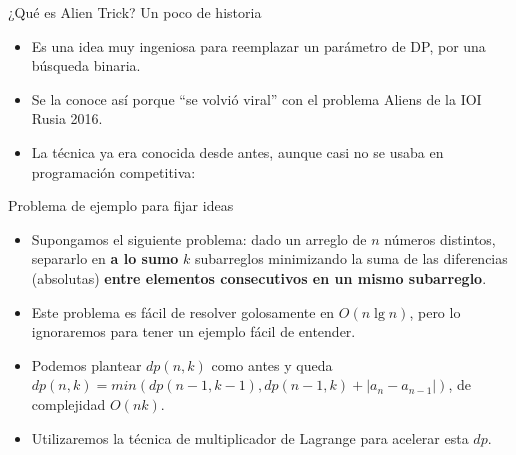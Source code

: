 \documentclass{beamer}
\begin{document}
\begin{frame}{¿Qué es Alien Trick? Un poco de historia}
    \begin{itemize}
		\item Es una idea muy ingeniosa para reemplazar un parámetro de DP, por una búsqueda binaria.
        \item Se la conoce así porque ``se volvió viral'' con el problema Aliens de la IOI Rusia 2016.
        \item La técnica ya era conocida desde antes, aunque casi no se usaba en programación competitiva:
        \pause
    \end{itemize}
\end{frame}

\begin{frame}{Problema de ejemplo para fijar ideas}
    \begin{itemize}
		\item Supongamos el siguiente problema: dado un arreglo de $n$ números distintos, separarlo en \textbf{a lo sumo} $k$ subarreglos minimizando la suma de las diferencias (absolutas) \textbf{entre elementos consecutivos en un mismo subarreglo}.
        \item Este problema es fácil de resolver golosamente en $O(n \lg n)$, pero lo ignoraremos para tener un ejemplo fácil de entender.
        \item Podemos plantear $dp(n,k)$ como antes y queda $dp(n,k) = min(dp(n-1,k-1), dp(n-1,k) + |a_n - a_{n-1}|)$, de complejidad $O(nk)$.
        \item Utilizaremos la técnica de multiplicador de Lagrange para acelerar esta $dp$.
    \end{itemize}
\end{frame}
\end{document}
